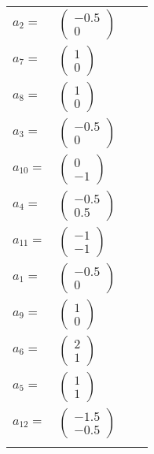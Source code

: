\documentclass[1p]{elsarticle_modified}
\theoremstyle{definition}
\begin{document}
\begin{tabular}{m{7pt} m{180pt} m{7pt} m{180pt} }
\flushright $a_{2}=$&$\begin{pmatrix}-0.5\\0\end{pmatrix}$ \\
\flushright $a_{7}=$&$\begin{pmatrix}1\\0\end{pmatrix}$ \\
\flushright $a_{8}=$&$\begin{pmatrix}1\\0\end{pmatrix}$ \\
\flushright $a_{3}=$&$\begin{pmatrix}-0.5\\0\end{pmatrix}$ \\
\flushright $a_{10}=$&$\begin{pmatrix}0\\-1\end{pmatrix}$ \\
\flushright $a_{4}=$&$\begin{pmatrix}-0.5\\0.5\end{pmatrix}$ \\
\flushright $a_{11}=$&$\begin{pmatrix}-1\\-1\end{pmatrix}$ \\
\flushright $a_{1}=$&$\begin{pmatrix}-0.5\\0\end{pmatrix}$ \\
\flushright $a_{9}=$&$\begin{pmatrix}1\\0\end{pmatrix}$ \\
\flushright $a_{6}=$&$\begin{pmatrix}2\\1\end{pmatrix}$ \\
\flushright $a_{5}=$&$\begin{pmatrix}1\\1\end{pmatrix}$ \\
\flushright $a_{12}=$&$\begin{pmatrix}-1.5\\-0.5\end{pmatrix}$\\&\end{tabular}
\end{document}
